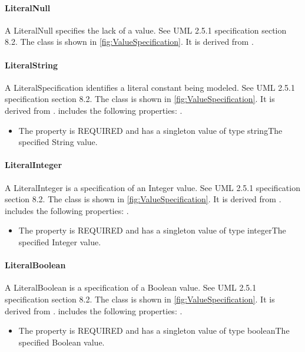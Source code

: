 \paragraph{LiteralNull}%
\label{sec:uml:LiteralNull}%
A LiteralNull specifies the lack of a value. See UML 2.5.1 specification section 8.2.%
\linebreak%
\linebreak%
The  class is shown in \ref{fig:ValueSpecification}. It is derived from .%
%
\paragraph{LiteralString}%
\label{sec:uml:LiteralString}%
A LiteralSpecification identifies a literal constant being modeled. See UML 2.5.1 specification section 8.2.%
\linebreak%
\linebreak%
The  class is shown in \ref{fig:ValueSpecification}. It is derived from .%
 includes the following properties: . %
\begin{itemize}%
\item%
The  property is REQUIRED and has a singleton value of type stringThe specified String value.%
\end{itemize}%
\paragraph{LiteralInteger}%
\label{sec:uml:LiteralInteger}%
A LiteralInteger is a specification of an Integer value. See UML 2.5.1 specification section 8.2.%
\linebreak%
\linebreak%
The  class is shown in \ref{fig:ValueSpecification}. It is derived from .%
 includes the following properties: . %
\begin{itemize}%
\item%
The  property is REQUIRED and has a singleton value of type integerThe specified Integer value.%
\end{itemize}%
\paragraph{LiteralBoolean}%
\label{sec:uml:LiteralBoolean}%
A LiteralBoolean is a specification of a Boolean value. See UML 2.5.1 specification section 8.2.%
\linebreak%
\linebreak%
The  class is shown in \ref{fig:ValueSpecification}. It is derived from .%
 includes the following properties: . %
\begin{itemize}%
\item%
The  property is REQUIRED and has a singleton value of type booleanThe specified Boolean value.%
\end{itemize}%
